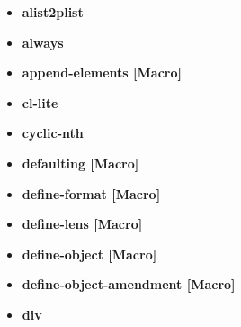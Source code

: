\documentclass [11pt]{book}
\begin{document}
\begin{itemize}

\item {}
\label{prim:alist2plist}
\textbf{alist2plist}





\item {}
\label{prim:always}
\textbf{always}





\item {}
\label{prim:append-elements}
\textbf{append-elements [Macro]}





\item {}
\label{prim:cl-lite}
\textbf{cl-lite}





\item {}
\label{prim:cyclic-nth}
\textbf{cyclic-nth}





\item {}
\label{prim:defaulting}
\textbf{defaulting [Macro]}





\item {}
\label{prim:define-format}
\textbf{define-format [Macro]}





\item {}
\label{prim:define-lens}
\textbf{define-lens [Macro]}





\item {}
\label{prim:define-object}
\textbf{define-object [Macro]}





\item {}
\label{prim:define-object-amendment}
\textbf{define-object-amendment [Macro]}





\item {}
\label{prim:div}
\textbf{div}






\end{itemize}
\end{document}
